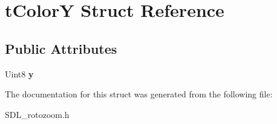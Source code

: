 \hypertarget{structtColorY}{}\section{t\+ColorY Struct Reference}
\label{structtColorY}
\subsection*{Public Attributes}
\begin{DoxyCompactItemize}
\item 
Uint8 {\bfseries y}\hypertarget{structtColorY_a5bfc0bfa51aa91262c1f0dc59c2092a0}{}\label{structtColorY_a5bfc0bfa51aa91262c1f0dc59c2092a0}

\end{DoxyCompactItemize}


The documentation for this struct was generated from the following file\+:\begin{DoxyCompactItemize}
\item 
S\+D\+L\+\_\+rotozoom.\+h\end{DoxyCompactItemize}
